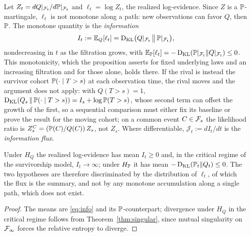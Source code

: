 \begin{definition}\label{def:info}
Let $Z_t=dQ|_{\mathcal{F}_t}/d\mathbb{P}|_{\mathcal{F}_t}$ and $\ell_t=\log Z_t$, the realized
log-evidence. Since $Z$ is a $\mathbb{P}$-martingale, $\ell_t$ is not monotone
along a path: new observations can favor $Q$, then $\mathbb{P}$. The monotone
quantity is the \emph{information}
\begin{equation}\label{eq:info}
I_t:=\mathbb{E}_Q[\ell_t]=\operatorname{D_{\mathrm{KL}}}\bigl(Q|_{\mathcal{F}_t}\,\big\|\,\mathbb{P}|_{\mathcal{F}_t}\bigr),
\end{equation}
nondecreasing in $t$ as the filtration grows, with
$\mathbb{E}_{\mathbb{P}}[\ell_t]=-\operatorname{D_{\mathrm{KL}}}(\mathbb{P}|_{\mathcal{F}_t}\|Q|_{\mathcal{F}_t})\le0$. This monotonicity, which the proposition asserts for fixed underlying laws and an increasing filtration and for those alone, holds there. If the rival is instead the survivor cohort $\mathbb{P}(\cdot \mid T > s)$ at each observation time, the rival moves and the argument does not apply: with $Q(T > s) = 1$, $\operatorname{D_{\mathrm{KL}}}(Q_s \,\|\, \mathbb{P}(\cdot \mid T > s)) = I_s + \log \mathbb{P}(T > s)$, whose second term can offset the growth of the first, so a sequential comparison must either fix its baseline or prove the result for the moving cohort; on a common event $C \in \mathcal{F}_s$ the likelihood ratio is $Z^{C}_s = (\mathbb{P}(C)/Q(C))\, Z_s$, not $Z_s$. Where differentiable,
$\mathcal J_t:=dI_t/dt$ is the \emph{information flux}.
\end{definition}

\begin{proposition}
\label{prop:discriminate}
Under $H_Q$ the realized log-evidence has mean $I_t\ge0$ and, in the
critical regime of the survivorship model, $I_t\to\infty$; under $H_{\mathbb{P}}$
it has mean $-\operatorname{D_{\mathrm{KL}}}(\mathbb{P}_t\|Q_t)\le0$. The two hypotheses are therefore
discriminated by the distribution of $\ell_t$, of which the flux is the
summary, and not by any monotone accumulation along a single path, which
does not exist.
\end{proposition}

\begin{proof}
The means are \eqref{eq:info} and its $\mathbb{P}$-counterpart; divergence under
$H_Q$ in the critical regime follows from Theorem~\ref{thm:singular},
since mutual singularity on $\mathcal{F}_\infty$ forces the relative entropy to
diverge.
\end{proof}

